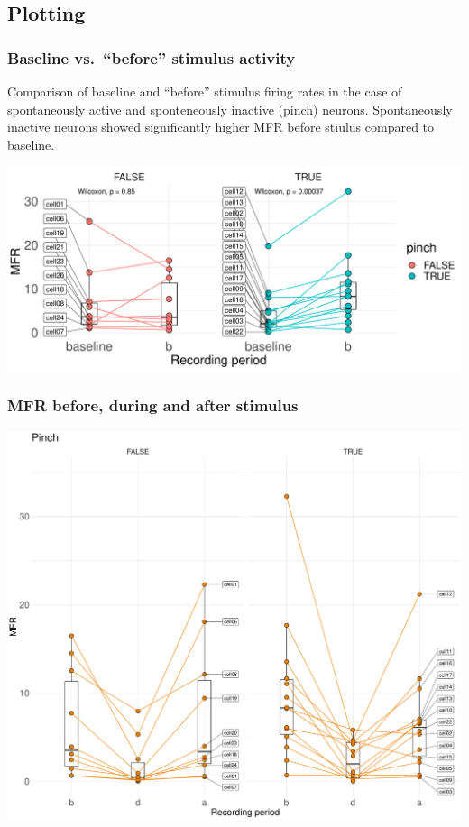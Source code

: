 \documentclass[12pt,]{article}
\begin{document}
\hypertarget{htmlwidget-ab7c3d295b8c6b1754be}{}

\hypertarget{plotting}{%
\subsection{Plotting}\label{plotting}}

\hypertarget{baseline-vs.-before-stimulus-activity}{%
\subsubsection{Baseline vs.~``before'' stimulus
activity}\label{baseline-vs.-before-stimulus-activity}}

Comparison of baseline and ``before'' stimulus firing rates in the case
of spontaneously active and sponteneously inactive (pinch) neurons.
Spontaneously inactive neurons showed significantly higher MFR before
stiulus compared to baseline.

\includegraphics{GII_analysis_notebook_files/figure-latex/unnamed-chunk-13-1.pdf}

\hypertarget{mfr-before-during-and-after-stimulus}{%
\subsubsection{MFR before, during and after
stimulus}\label{mfr-before-during-and-after-stimulus}}

\includegraphics{GII_analysis_notebook_files/figure-latex/unnamed-chunk-14-1.pdf}
\end{document}
